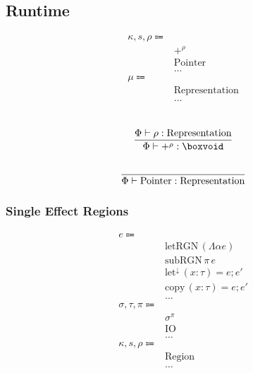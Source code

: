 \documentclass {article}
\begin{document}
\subsection{Runtime}

\begin{align*}
\kappa, s, \rho \Coloneqq & \\
& +^\rho \tag{Pretype Kind}\\
& \text{Pointer} \tag{Pointer Representation}\\
& \dots \\
\mu \Coloneqq & \\
& \text{Representation} \\
& \dots
\end{align*}

\begin{gather*}
\\
\frac
{\Phi \vdash \rho : \text{Representation}}
{\Phi \vdash +^\rho : \boxvoid} \\
\\
\frac
{}
{\Phi \vdash \text{Pointer} : \text{Representation}} \\
\end{gather*}

\subsubsection{Single Effect Regions}
\begin{align*}
e \Coloneqq & \\
& \text{letRGN} \, (\Lambda \alpha e) \tag{Create Region} \\
& \text{subRGN} \, \pi \, e \tag{Subtype Region} \\
& \text{let}^\downarrow \, (x : \tau) = e; e' \tag{Runtime Let} \\
& \text{copy} \, (x : \tau) = e; e' \tag{Runtime Copy Let} \\
& \dots \\
\sigma, \tau, \pi \Coloneqq & \\
& \sigma^\pi \tag{Region Effect} \\
& \text{IO} \tag{IO Region} \\
& \dots \\
\kappa, s, \rho \Coloneqq & \\
& \text{Region} \tag{Region} \\
& \dots
\end{align*}
\end{document}
